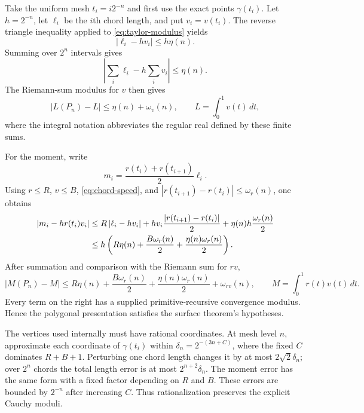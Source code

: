 \documentclass[11pt]{article}
\theoremstyle{definition}
\newcommand{\abs}[1]{\left|#1\right|}
\begin{document}
Take the uniform mesh $t_i=i2^{-n}$ and first use the exact points
$\gamma(t_i)$.  Let $h=2^{-n}$, let $\ell_i$ be the $i$th chord length, and
put $v_i=v(t_i)$.  The reverse triangle inequality applied to
\eqref{eq:taylor-modulus} yields
\begin{equation}
 \abs{\ell_i-hv_i}\leq h\eta(n).
 \label{eq:chord-speed}
\end{equation}
Summing over $2^n$ intervals gives
\begin{equation}
 \left|\sum_i\ell_i-h\sum_i v_i\right|\leq\eta(n).
 \label{eq:length-rsum}
\end{equation}
The Riemann-sum modulus for $v$ then gives
\begin{equation}
 \abs{L(P_n)-L}\leq\eta(n)+\omega_v(n),
 \qquad L=\int_0^1v(t)\,dt,
 \label{eq:length-convergence}
\end{equation}
where the integral notation abbreviates the regular real defined by these
finite sums.

For the moment, write
\[
 m_i=\frac{r(t_i)+r(t_{i+1})}{2}\ell_i.
\]
Using $r\leq R$, $v\leq B$, \eqref{eq:chord-speed}, and
$\abs{r(t_{i+1})-r(t_i)}\leq\omega_r(n)$, one obtains
\begin{align}
 \abs{m_i-hr(t_i)v_i}
 &\leq R\abs{\ell_i-hv_i}
   +hv_i\frac{\abs{r(t_{i+1})-r(t_i)}}2
   +\eta(n)h\frac{\omega_r(n)}2\notag\\
 &\leq h\left(R\eta(n)+\frac{B\omega_r(n)}2
   +\frac{\eta(n)\omega_r(n)}2\right).
 \label{eq:moment-cell-error}
\end{align}
After summation and comparison with the Riemann sum for $rv$,
\begin{equation}
 \abs{M(P_n)-M}
 \leq R\eta(n)+\frac{B\omega_r(n)}2
      +\frac{\eta(n)\omega_r(n)}2+\omega_{rv}(n),
 \qquad M=\int_0^1r(t)v(t)\,dt.
 \label{eq:moment-convergence}
\end{equation}
Every term on the right has a supplied primitive-recursive convergence
modulus.  Hence the polygonal presentation satisfies the surface theorem's
hypotheses.

The vertices used internally must have rational coordinates.  At mesh level
$n$, approximate each coordinate of $\gamma(t_i)$ within
$\delta_n=2^{-(3n+C)}$, where the fixed $C$ dominates $R+B+1$.  Perturbing one
chord length changes it by at most $2\sqrt2\delta_n$; over $2^n$ chords the
total length error is at most $2^{n+2}\delta_n$.  The moment error has the
same form with a fixed factor depending on $R$ and $B$.  These errors are
bounded by $2^{-n}$ after increasing $C$.  Thus rationalization preserves the
explicit Cauchy moduli.
\end{document}
